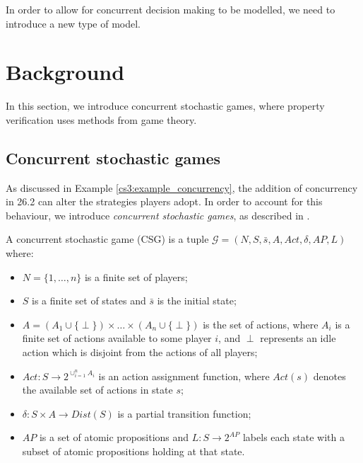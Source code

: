 In order to allow for concurrent decision making to be modelled, we need to introduce a new type of model.

\section{Background}

In this section, we introduce concurrent stochastic games, where property verification uses methods from game theory.

\subsection{Concurrent stochastic games}

As discussed in Example \ref{cs3:example_concurrency}, the addition of concurrency in 26.2 can alter the strategies players adopt. In order to account for this behaviour, we introduce \emph{concurrent stochastic games}, as described in \cite{kwiatkowska_automated_2018}.

\begin{definition}
    \label{cs3:def_csgs}

    A concurrent stochastic game (CSG) is a tuple $\mathcal{G} {=} (N, S, \bar{s}, A, Act, \delta, AP, L)$ where:

    \begin{itemize}
        \item $N = \{ 1, \dots, n \} $ is a finite set of players;
        \item $S$ is a finite set of states and $\bar{s}$ is the initial state;
        \item $A = \left(A_1 \cup \{\perp\} \right) \times \dots \times \left(A_n \cup \{\perp \} \right)$ is the set of actions, where $A_i$ is a finite set of actions available to some player $i$, and $\perp$ represents an idle action which is disjoint from the actions of all players;
        \item $Act: S \rightarrow 2^{\cup_{i=1}^{n} A_{i}}$ is an action assignment function, where $Act(s)$ denotes the available set of actions in state $s$; %
        \item $\delta : S \times A \rightarrow Dist(S)$ is a partial transition function;
        \item $AP$ is a set of atomic propositions and $L : S \rightarrow 2^{AP}$ labels each state with a subset of atomic propositions holding at that state.
    \end{itemize}
\end{definition}

